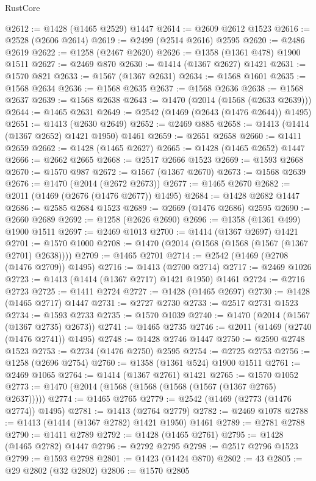 \begin{lexlean}{RustCore}
\begin{coremodule}
{\begin{coremodule}
{{{{{{{{{{{{{{{{{{{{{{{{{{{{{{{{{{{{{{{{{{{{{{{@2612 := @1428 (@1465 @2529) @1447
@2614 := @2609 @2612 @1523
@2616 := @2528 (@2606 @2614)
@2619 := @2499 (@2514 @2616) @2595
@2620 := @2486 @2619
@2622 := @1258 (@2467 @2620)
@2626 := @1358 (@1361 @478) @1900 @1511
@2627 := @2469 @870
@2630 := @1414 (@1367 @2627) @1421
@2631 := @1570 @821
@2633 := @1567 (@1367 @2631)
@2634 := @1568 @1601
@2635 := @1568 @2634
@2636 := @1568 @2635
@2637 := @1568 @2636
@2638 := @1568 @2637
@2639 := @1568 @2638
@2643 := @1470 (@2014 (@1568 (@2633 @2639)))
@2644 := @1465 @2631
@2649 := @2542 (@1469 (@2643 (@1476 @2644)) @1495)
@2651 := @1413 (@2630 @2649)
@2652 := @2469 @885
@2658 := @1413 (@1414 (@1367 @2652) @1421 @1950) @1461
@2659 := @2651 @2658
@2660 := @1411 @2659
@2662 := @1428 (@1465 @2627)
@2665 := @1428 (@1465 @2652) @1447
@2666 := @2662 @2665
@2668 := @2517 @2666 @1523
@2669 := @1593 @2668
@2670 := @1570 @987
@2672 := @1567 (@1367 @2670)
@2673 := @1568 @2639
@2676 := @1470 (@2014 (@2672 @2673))
@2677 := @1465 @2670
@2682 := @2011 (@1469 (@2676 (@1476 @2677)) @1495)
@2684 := @1428 @2682 @1447
@2686 := @2585 @2684 @1523
@2689 := @2669 (@1476 @2686) @2595
@2690 := @2660 @2689
@2692 := @1258 (@2626 @2690)
@2696 := @1358 (@1361 @499) @1900 @1511
@2697 := @2469 @1013
@2700 := @1414 (@1367 @2697) @1421
@2701 := @1570 @1000
@2708 := @1470 (@2014 (@1568 (@1568 (@1567 (@1367 @2701) @2638))))
@2709 := @1465 @2701
@2714 := @2542 (@1469 (@2708 (@1476 @2709)) @1495)
@2716 := @1413 (@2700 @2714)
@2717 := @2469 @1026
@2723 := @1413 (@1414 (@1367 @2717) @1421 @1950) @1461
@2724 := @2716 @2723
@2725 := @1411 @2724
@2727 := @1428 (@1465 @2697)
@2730 := @1428 (@1465 @2717) @1447
@2731 := @2727 @2730
@2733 := @2517 @2731 @1523
@2734 := @1593 @2733
@2735 := @1570 @1039
@2740 := @1470 (@2014 (@1567 (@1367 @2735) @2673))
@2741 := @1465 @2735
@2746 := @2011 (@1469 (@2740 (@1476 @2741)) @1495)
@2748 := @1428 @2746 @1447
@2750 := @2590 @2748 @1523
@2753 := @2734 (@1476 @2750) @2595
@2754 := @2725 @2753
@2756 := @1258 (@2696 @2754)
@2760 := @1358 (@1361 @524) @1900 @1511
@2761 := @2469 @1065
@2764 := @1414 (@1367 @2761) @1421
@2765 := @1570 @1052
@2773 := @1470 (@2014 (@1568 (@1568 (@1568 (@1567 (@1367 @2765) @2637)))))
@2774 := @1465 @2765
@2779 := @2542 (@1469 (@2773 (@1476 @2774)) @1495)
@2781 := @1413 (@2764 @2779)
@2782 := @2469 @1078
@2788 := @1413 (@1414 (@1367 @2782) @1421 @1950) @1461
@2789 := @2781 @2788
@2790 := @1411 @2789
@2792 := @1428 (@1465 @2761)
@2795 := @1428 (@1465 @2782) @1447
@2796 := @2792 @2795
@2798 := @2517 @2796 @1523
@2799 := @1593 @2798
@2801 := @1423 (@1424 @870)
@2802 := 43
@2805 := @29 @2802 (@32 @2802)
@2806 := @1570 @2805
}}}}}}}}}}}}}}}}}}}}}}}}}}}}}}}}}}}}}}}}}}}}}}}
\end{coremodule}}
\end{coremodule}
\end{lexlean}

